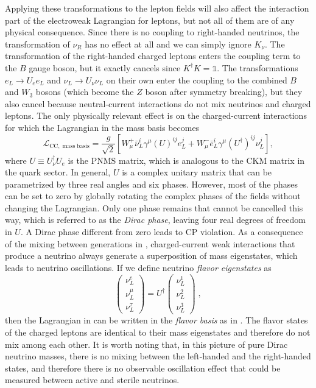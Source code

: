 Applying these transformations to the lepton fields will also affect the interaction part of the electroweak Lagrangian for leptons, but not all of them are of any physical consequence. Since there is no coupling to right-handed neutrinos, the transformation of $\nu_R$ has no effect at all and we can simply ignore $K_\nu$. The transformation of the right-handed charged leptons enters the coupling term to the $B$ gauge boson, but it exactly cancels since $K^\dag K = \mathbb{1}$. The transformations $e_L \rightarrow U_e e_L$ and $\nu_L \rightarrow U_\nu \nu_L$ on their own enter the coupling to the combined $B$ and $W_3$ bosons (which become the $Z$ boson after symmetry breaking), but they also cancel because neutral-current interactions do not mix neutrinos and charged leptons. The only physically relevant effect is on the charged-current interactions for which the Lagrangian in the mass basis becomes
\begin{equation}
    \mathcal{L}_\mathrm{CC,\;mass\;basis} = \frac{g}{\sqrt{2}}
    \left[
        W^+_\mu \bar{\nu}_L^i \gamma^\mu (U)^{ij} e_L^j
        + W^-_\mu \bar{e}_L^i \gamma^\mu (U^\dag)^{ij} \nu_L^j
    \right],\label{eq:lag-cc-mass-basis}
\end{equation}
where $U\equiv U_\nu^\dag U_e$ is the PNMS matrix, which is analogous to the CKM matrix in the quark sector. In general, $U$ is a complex unitary matrix that can be parametrized by three real angles and six phases. However, most of the phases can be set to zero by globally rotating the complex phases of the fields without changing the Lagrangian. Only one phase remains that cannot be cancelled this way, which is referred to as the \emph{Dirac phase}, leaving four real degrees of freedom in $U$. A Dirac phase different from zero leads to CP violation.
As a consequence of the mixing between generations in , charged-current weak interactions that produce a neutrino always generate a superposition of mass eigenstates, which leads to neutrino oscillations. If we define neutrino \emph{flavor eigenstates} as
\begin{equation}
    \begin{pmatrix}
        \nu_{L}^e \\
        \nu_{L}^\mu \\
        \nu_{L}^\tau
    \end{pmatrix}
    = U^\dag
    \begin{pmatrix}
        \nu_{L}^1 \\
        \nu_{L}^2 \\
        \nu_{L}^3
    \end{pmatrix}\;,
\end{equation}
then the Lagrangian in  can be written in the \emph{flavor basis} as in . The flavor states of the charged leptons are identical to their mass eigenstates and therefore do not mix among each other. It is worth noting that, in this picture of pure Dirac neutrino masses, there is no mixing between the left-handed and the right-handed states, and therefore there is no observable oscillation effect that could be measured between active and sterile neutrinos.


